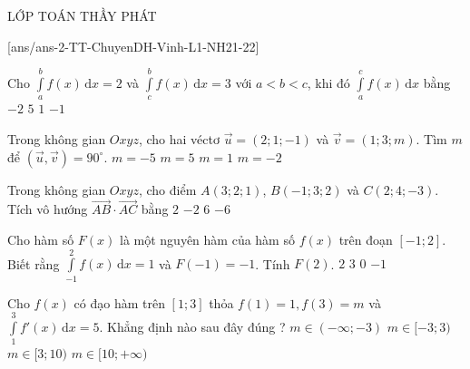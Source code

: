\begin{name}
{\tenchude}{\tendethi}{LỚP TOÁN THẦY PHÁT}{\thoigian}
\end{name}

[ans/ans-2-TT-ChuyenDH-Vinh-L1-NH21-22]
\begin{ex}%
Cho $\displaystyle\int\limits_a^b f(x)\mathrm{\,d}x=2$ và $\displaystyle\int\limits_c^b f(x)\mathrm{\,d}x=3$ với $a<b<c$, khi đó $\displaystyle\int\limits_a^c f(x)\mathrm{\,d}x$ bằng
\choice
{$-2$}
{$5$}
{$1$}
{\True $-1$}
\end{ex}

\begin{ex}%
Trong không gian $Oxyz$, cho hai véctơ $\vec{u}=\left(2;1;-1\right)$ và $\vec{v}=\left(1;3;m\right)$. Tìm $m$ để $\left(\vec{u},\vec{v}\right)=90^\circ$.
\choice
{$m=-5$}
{\True $m=5$}
{$m=1$}
{$m=-2$}
\end{ex}

\begin{ex}%
Trong không gian $Oxyz$, cho điểm $A\left(3;2;1\right)$, $B\left(-1;3;2\right)$ và $C\left(2;4;-3\right)$. Tích vô hướng $\vec{AB}\cdot \vec{AC}$ bằng
\choice
{\True $2$}
{$-2$}
{$6$}
{$-6$}
\end{ex}

\begin{ex}%
Cho hàm số $F(x)$ là một nguyên hàm của hàm số $f(x)$ trên đoạn $[-1; 2]$. Biết rằng $\displaystyle\int\limits_{-1}^2 f(x)\mathrm{\,d}x=1$ và $F(-1)=-1$. Tính $F(2)$.
\choice
{$2$}
{$3$}
{\True $0$}
{$-1$}
\end{ex}

\begin{ex}%
Cho $f(x)$ có đạo hàm trên $[1; 3]$ thỏa $f(1)=1, f(3)=m$ và $\displaystyle\int\limits_1^3 f'(x)\mathrm{\,d}x=5$. Khẳng định nào sau đây đúng ?
\choice
{$m \in(-\infty; -3)$}
{$m \in[-3; 3)$}
{\True $m \in[3; 10)$}
{$m \in[10;+ \infty)$}
\loigiai{
Ta có $\displaystyle\int\limits_1^3 f'(x) \mathrm{\,d}x=f(x)\Big|_1^3=f(3)-f(1)=m-1$.\\
Suy ra $m-1=5\Leftrightarrow m=6\in [3;10)$.
}
\end{ex}

